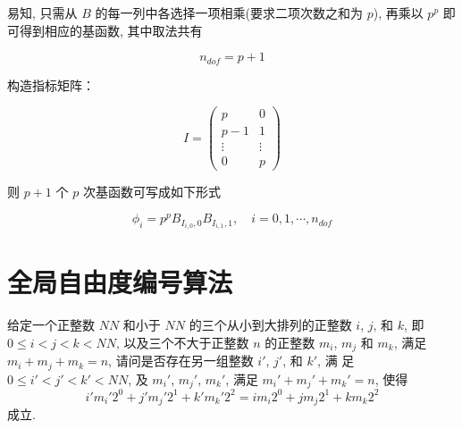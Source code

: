 \documentclass{article}
\begin{document}
易知, 只需从 \(B\) 的每一列中各选择一项相乘(要求二项次数之和为 \(p\)),
再乘以 \(p^p\) 即可得到相应的基函数, 其中取法共有

\[
n_{dof} = {p+1}
\]

构造指标矩阵：

\[
I = \begin{pmatrix}
p  & 0 \\ p-1 & 1 \\ \vdots & \vdots \\ 0 & p
\end{pmatrix}
\]

则 \(p+1\) 个 \(p\) 次基函数可写成如下形式

\[
\phi_i = p^pB_{I_{i,0}, 0}B_{I_{i, 1},1}, \quad i = 0, 1, \cdots, n_{dof}
\]

\section{全局自由度编号算法}

给定一个正整数 $NN$ 和小于 $NN$ 的三个从小到大排列的正整数 $i$, $j$, 和 $k$, 即
$0 \leq i < j < k < NN$, 以及三个不大于正整数 $n$ 的正整数 $m_i$, $m_j$ 和
$m_k$, 满足 $m_i + m_j + m_k = n$, 请问是否存在另一组整数 $i'$, $j'$, 和 $k'$, 满
足 $0 \leq i' < j' < k' < NN$,  及 $m_i'$, $m_j'$, $m_k'$, 满足 $m_i' + m_j' +
m_k' = n$, 使得 
$$ 
i'm_i'2^0 + j'm_j'2^1 + k'm_k'2^2 = im_i2^0 + jm_j2^1 + km_k2^2 
$$ 
成立.











\end{document}
